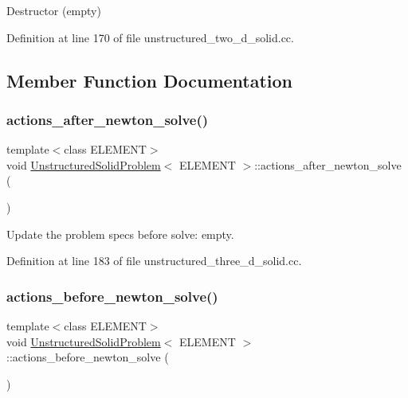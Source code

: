 Destructor (empty) 



Definition at line 170 of file unstructured\+\_\+two\+\_\+d\+\_\+solid.\+cc.



\subsection{Member Function Documentation}
\mbox{\label{classUnstructuredSolidProblem_a57946bc2c0d083d74c3e9416f882f7c0}} 
\subsubsection{\texorpdfstring{actions\+\_\+after\+\_\+newton\+\_\+solve()}{actions\_after\_newton\_solve()}}
{\footnotesize\ttfamily template$<$class E\+L\+E\+M\+E\+NT$>$ \\
void \hyperlink{classUnstructuredSolidProblem}{Unstructured\+Solid\+Problem}$<$ E\+L\+E\+M\+E\+NT $>$\+::actions\+\_\+after\+\_\+newton\+\_\+solve (\begin{DoxyParamCaption}{ }\end{DoxyParamCaption})\hspace{0.3cm}{\ttfamily [inline]}}



Update the problem specs before solve\+: empty. 



Definition at line 183 of file unstructured\+\_\+three\+\_\+d\+\_\+solid.\+cc.

\mbox{\label{classUnstructuredSolidProblem_af8139cf00952aaf56cea69ec5859b742}} 
\subsubsection{\texorpdfstring{actions\+\_\+before\+\_\+newton\+\_\+solve()}{actions\_before\_newton\_solve()}}
{\footnotesize\ttfamily template$<$class E\+L\+E\+M\+E\+NT$>$ \\
void \hyperlink{classUnstructuredSolidProblem}{Unstructured\+Solid\+Problem}$<$ E\+L\+E\+M\+E\+NT $>$\+::actions\+\_\+before\+\_\+newton\+\_\+solve (\begin{DoxyParamCaption}{ }\end{DoxyParamCaption})\hspace{0.3cm}{\ttfamily [inline]}}



